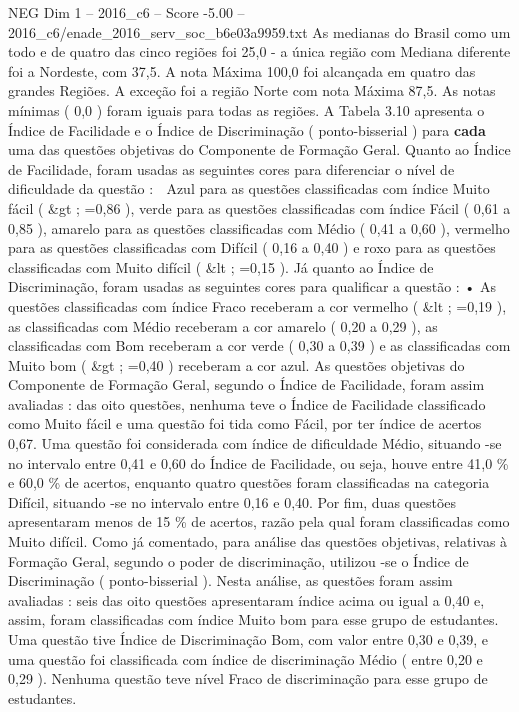 \begin{textsample}{NEG Dim 1 – 2016\_c6 – Score -5.00 – 2016\_c6/enade\_2016\_serv\_soc\_b6e03a9959.txt}
As medianas do Brasil como um todo e de quatro das cinco regiões foi 25,0 - a única região com Mediana diferente foi a Nordeste, com 37,5.
A nota Máxima 100,0 foi alcançada em quatro das grandes Regiões.
A exceção foi a região Norte com nota Máxima 87,5.
As notas mínimas ( 0,0 ) foram iguais para todas as regiões.
A Tabela 3.10 apresenta o Índice de Facilidade e o Índice de Discriminação ( ponto-bisserial ) para \textbf{cada} uma das questões objetivas do Componente de Formação Geral.
Quanto ao Índice de Facilidade, foram usadas as seguintes cores para diferenciar o nível de dificuldade da questão :  Azul para as questões classificadas com índice Muito fácil ( \&gt ; =0,86 ), verde para as questões classificadas com índice Fácil ( 0,61 a 0,85 ), amarelo para as questões classificadas com Médio ( 0,41 a 0,60 ), vermelho para as questões classificadas com Difícil ( 0,16 a 0,40 ) e roxo para as questões classificadas com Muito difícil ( \&lt ; =0,15 ).
Já quanto ao Índice de Discriminação, foram usadas as seguintes cores para qualificar a questão : • As questões classificadas com índice Fraco receberam a cor vermelho ( \&lt ; =0,19 ), as classificadas com Médio receberam a cor amarelo ( 0,20 a 0,29 ), as classificadas com Bom receberam a cor verde ( 0,30 a 0,39 ) e as classificadas com Muito bom ( \&gt ; =0,40 ) receberam a cor azul.
As questões objetivas do Componente de Formação Geral, segundo o Índice de Facilidade, foram assim avaliadas : das oito questões, nenhuma teve o Índice de Facilidade classificado como Muito fácil e uma questão foi tida como Fácil, por ter índice de acertos 0,67.
Uma questão foi considerada com índice de dificuldade Médio, situando -se no intervalo entre 0,41 e 0,60 do Índice de Facilidade, ou seja, houve entre 41,0 \% e 60,0 \% de acertos, enquanto quatro questões foram classificadas na categoria Difícil, situando -se no intervalo entre 0,16 e 0,40.
Por fim, duas questões apresentaram menos de 15 \% de acertos, razão pela qual foram classificadas como Muito difícil.
Como já comentado, para análise das questões objetivas, relativas à Formação Geral, segundo o poder de discriminação, utilizou -se o Índice de Discriminação ( ponto-bisserial ).
Nesta análise, as questões foram assim avaliadas : seis das oito questões apresentaram índice acima ou igual a 0,40 e, assim, foram classificadas com índice Muito bom para esse grupo de estudantes.
Uma questão tive Índice de Discriminação Bom, com valor entre 0,30 e 0,39, e uma questão foi classificada com índice de discriminação Médio ( entre 0,20 e 0,29 ).
Nenhuma questão teve nível Fraco de discriminação para esse grupo de estudantes.

\end{textsample}
